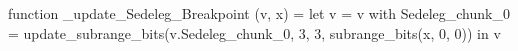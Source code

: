 function _update_Sedeleg_Breakpoint (v, x) = let v = { v with Sedeleg_chunk_0 = update_subrange_bits(v.Sedeleg_chunk_0, 3, 3, subrange_bits(x, 0, 0)) } in
  v
